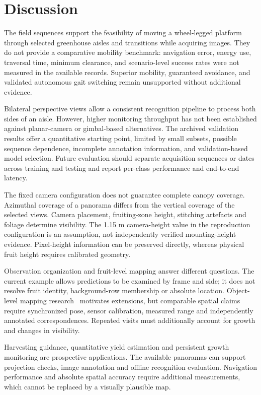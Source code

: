 \documentclass[agriengineering,article,submit,pdftex,moreauthors]{Definitions/mdpi}
\begin{document}
\section{Discussion}
The field sequences support the feasibility of moving a wheel-legged platform through selected greenhouse aisles and transitions while acquiring images. They do not provide a comparative mobility benchmark: navigation error, energy use, traversal time, minimum clearance, and scenario-level success rates were not measured in the available records. Superior mobility, guaranteed avoidance, and validated autonomous gait switching remain unsupported without additional evidence.

Bilateral perspective views allow a consistent recognition pipeline to process both sides of an aisle. However, higher monitoring throughput has not been established against planar-camera or gimbal-based alternatives. The archived validation results offer a quantitative starting point, limited by small subsets, possible sequence dependence, incomplete annotation information, and validation-based model selection. Future evaluation should separate acquisition sequences or dates across training and testing and report per-class performance and end-to-end latency.

The fixed camera configuration does not guarantee complete canopy coverage. Azimuthal coverage of a panorama differs from the vertical coverage of the selected views. Camera placement, fruiting-zone height, stitching artefacts and foliage determine visibility. The 1.15 m camera-height value in the reproduction configuration is an assumption, not independently verified mounting-height evidence. Pixel-height information can be preserved directly, whereas physical fruit height requires calibrated geometry.

Observation organization and fruit-level mapping answer different questions. The current example allows predictions to be examined by frame and side; it does not resolve fruit identity, background-row membership or absolute location. Object-level mapping research~\cite{rapado2025tree,nellithimaru2019rols,pan2024novel} motivates extensions, but comparable spatial claims require synchronized pose, sensor calibration, measured range and independently annotated correspondences. Repeated visits must additionally account for growth and changes in visibility.

Harvesting guidance, quantitative yield estimation and persistent growth monitoring are prospective applications. The available panoramas can support projection checks, image annotation and offline recognition evaluation. Navigation performance and absolute spatial accuracy require additional measurements, which cannot be replaced by a visually plausible map.
\end{document}
